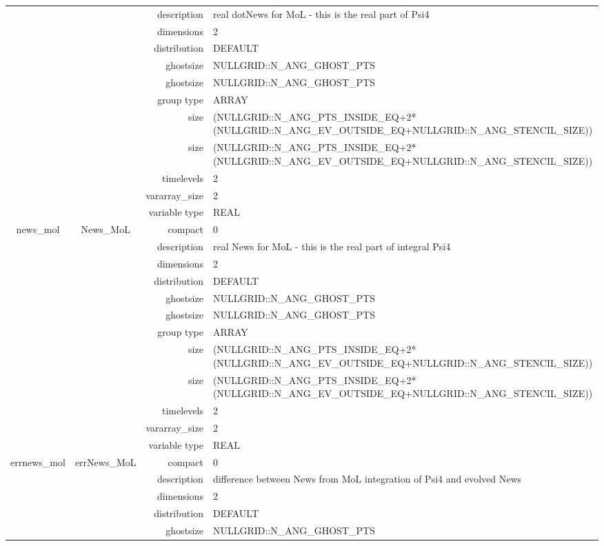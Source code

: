 \begin{tabular*}{150mm}{|c|c@{\extracolsep{\fill}}|rl|}
 &  & description & real dotNews for MoL - this is the real part of Psi4 \\ 
 &  & dimensions & 2 \\ 
 &  & distribution & DEFAULT \\ 
 &  & ghostsize & NULLGRID::N\_ANG\_GHOST\_PTS \\ 
& ~ & ghostsize & NULLGRID::N\_ANG\_GHOST\_PTS \\ 
 &  & group type & ARRAY \\ 
 &  & size & (NULLGRID::N\_ANG\_PTS\_INSIDE\_EQ+2*(NULLGRID::N\_ANG\_EV\_OUTSIDE\_EQ+NULLGRID::N\_ANG\_STENCIL\_SIZE)) \\ 
& ~ & size & (NULLGRID::N\_ANG\_PTS\_INSIDE\_EQ+2*(NULLGRID::N\_ANG\_EV\_OUTSIDE\_EQ+NULLGRID::N\_ANG\_STENCIL\_SIZE)) \\ 
 &  & timelevels & 2 \\ 
 &  & vararray\_size & 2 \\ 
 &  & variable type & REAL \\ 
\hline 
news\_mol & News\_MoL & compact & 0 \\ 
 &  & description & real News for MoL - this is the real part of integral Psi4 \\ 
 &  & dimensions & 2 \\ 
 &  & distribution & DEFAULT \\ 
 &  & ghostsize & NULLGRID::N\_ANG\_GHOST\_PTS \\ 
& ~ & ghostsize & NULLGRID::N\_ANG\_GHOST\_PTS \\ 
 &  & group type & ARRAY \\ 
 &  & size & (NULLGRID::N\_ANG\_PTS\_INSIDE\_EQ+2*(NULLGRID::N\_ANG\_EV\_OUTSIDE\_EQ+NULLGRID::N\_ANG\_STENCIL\_SIZE)) \\ 
& ~ & size & (NULLGRID::N\_ANG\_PTS\_INSIDE\_EQ+2*(NULLGRID::N\_ANG\_EV\_OUTSIDE\_EQ+NULLGRID::N\_ANG\_STENCIL\_SIZE)) \\ 
 &  & timelevels & 2 \\ 
 &  & vararray\_size & 2 \\ 
 &  & variable type & REAL \\ 
\hline 
errnews\_mol & errNews\_MoL & compact & 0 \\ 
 &  & description & difference between News from MoL integration of Psi4 and evolved News \\ 
 &  & dimensions & 2 \\ 
 &  & distribution & DEFAULT \\ 
 &  & ghostsize & NULLGRID::N\_ANG\_GHOST\_PTS \\ 

\end{tabular*}
